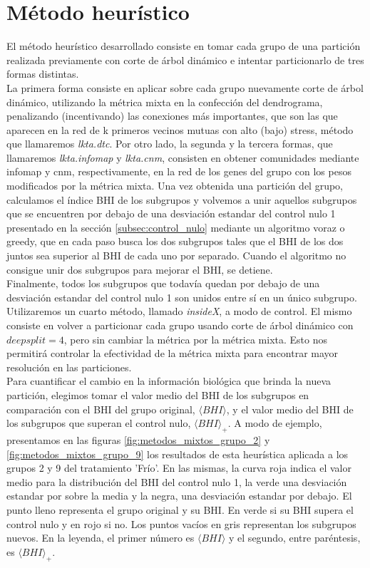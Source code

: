\section{Método heurístico}
El método heurístico desarrollado consiste en tomar cada grupo de una partición realizada previamente con corte de árbol dinámico e intentar particionarlo de tres formas distintas.\\
La primera forma consiste en aplicar sobre cada grupo nuevamente corte de árbol dinámico, utilizando la métrica mixta en la confección del dendrograma, penalizando (incentivando) las conexiones más importantes, que son las que aparecen en la red de k primeros vecinos mutuas con alto (bajo) stress, método que llamaremos \textit{lkta.dtc}. Por otro lado, la segunda y la tercera formas, que llamaremos \textit{lkta.infomap} y \textit{lkta.cnm}, consisten en obtener comunidades mediante infomap y cnm, respectivamente, en la red de los genes del grupo con los pesos modificados por la métrica mixta. Una vez obtenida una partición del grupo, calculamos el índice BHI de los subgrupos y volvemos a unir aquellos subgrupos que se encuentren por debajo de una desviación estandar del control nulo 1 presentado en la sección \ref{subsec:control_nulo} mediante un algoritmo voraz o greedy, que en cada paso busca los dos subgrupos tales que el BHI de los dos juntos sea superior al BHI de cada uno por separado. Cuando el algoritmo no consigue unir dos subgrupos para mejorar el BHI, se detiene.\\ Finalmente, todos los subgrupos que todavía quedan por debajo de una desviación estandar del control nulo 1 son unidos entre sí en un único subgrupo.\\
Utilizaremos un cuarto método, llamado \textit{insideX}, a modo de control. El mismo consiste en volver a particionar cada grupo usando corte de árbol dinámico con $deepsplit=4$, pero sin cambiar la métrica por la métrica mixta. Esto nos permitirá controlar la efectividad de la métrica mixta para encontrar mayor resolución en las particiones.\\
Para cuantificar el cambio en la información biológica que brinda la nueva partición, elegimos tomar el valor medio del BHI de los subgrupos en comparación con el BHI del grupo original, $\langle BHI \rangle$, y el valor medio del BHI de los subgrupos que superan el control nulo, $\langle BHI \rangle _{+}$. 
A modo de ejemplo, presentamos en las figuras \ref{fig:metodos_mixtos_grupo_2} y \ref{fig:metodos_mixtos_grupo_9} los resultados de esta heurística aplicada a los grupos 2 y 9 del tratamiento 'Frío'. En las mismas, la curva roja indica el valor medio para la distribución del BHI del control nulo 1, la verde una desviación estandar por sobre la media y la negra, una desviación estandar por debajo. El punto lleno representa el grupo original y su BHI. En verde si su BHI supera el control nulo y en rojo si no. Los puntos vacíos en gris representan los subgrupos nuevos. En la leyenda, el primer número es $\langle BHI \rangle$ y el segundo, entre paréntesis, es $\langle BHI \rangle _{+}$.\\
